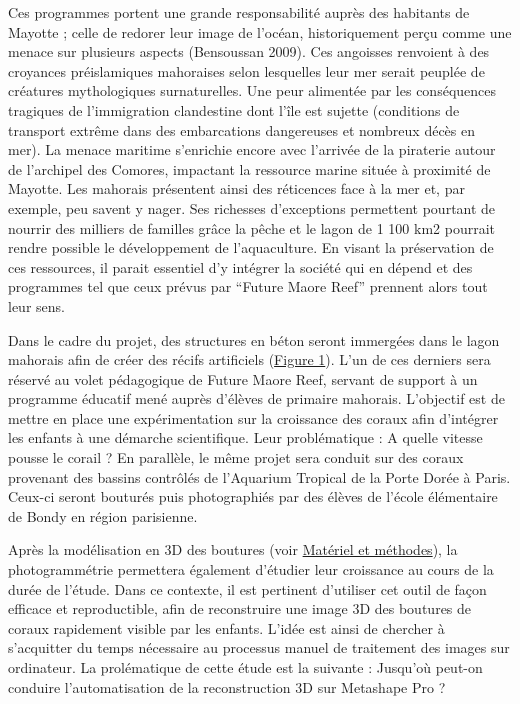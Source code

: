 \documentclass[]{article}
\begin{document}
Ces programmes portent une grande responsabilité auprès des habitants de
Mayotte ; celle de redorer leur image de l'océan, historiquement perçu
comme une menace sur plusieurs aspects (Bensoussan 2009). Ces angoisses
renvoient à des croyances préislamiques mahoraises selon lesquelles leur
mer serait peuplée de créatures mythologiques surnaturelles. Une peur
alimentée par les conséquences tragiques de l'immigration clandestine
dont l'île est sujette (conditions de transport extrême dans des
embarcations dangereuses et nombreux décès en mer). La menace maritime
s'enrichie encore avec l'arrivée de la piraterie autour de l'archipel
des Comores, impactant la ressource marine située à proximité de
Mayotte. Les mahorais présentent ainsi des réticences face à la mer et,
par exemple, peu savent y nager. Ses richesses d'exceptions permettent
pourtant de nourrir des milliers de familles grâce la pêche et le lagon
de 1 100 km2 pourrait rendre possible le développement de l'aquaculture.
En visant la préservation de ces ressources, il parait essentiel d'y
intégrer la société qui en dépend et des programmes tel que ceux prévus
par ``Future Maore Reef'' prennent alors tout leur sens.

Dans le cadre du projet, des structures en béton seront immergées dans
le lagon mahorais afin de créer des récifs artificiels
(\protect\hyperlink{fig:Figureux5cux25201}{Figure 1}). L'un de ces
derniers sera réservé au volet pédagogique de Future Maore Reef, servant
de support à un programme éducatif mené auprès d'élèves de primaire
mahorais. L'objectif est de mettre en place une expérimentation sur la
croissance des coraux afin d'intégrer les enfants à une démarche
scientifique. Leur problématique : A quelle vitesse pousse le corail ?
En parallèle, le même projet sera conduit sur des coraux provenant des
bassins contrôlés de l'Aquarium Tropical de la Porte Dorée à Paris.
Ceux-ci seront bouturés puis photographiés par des élèves de l'école
élémentaire de Bondy en région parisienne.

Après la modélisation en 3D des boutures (voir
\protect\hyperlink{Matuxe9rielux5cux2520etux5cux2520muxe9thodes}{Matériel
et méthodes}), la photogrammétrie permettera également d'étudier leur
croissance au cours de la durée de l'étude. Dans ce contexte, il est
pertinent d'utiliser cet outil de façon efficace et reproductible, afin
de reconstruire une image 3D des boutures de coraux rapidement visible
par les enfants. L'idée est ainsi de chercher à s'acquitter du temps
nécessaire au processus manuel de traitement des images sur ordinateur.
La prolématique de cette étude est la suivante : Jusqu'où peut-on
conduire l'automatisation de la reconstruction 3D sur Metashape Pro ?
\end{document}
